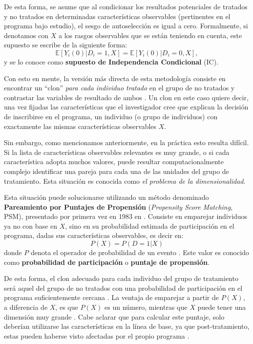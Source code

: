 \documentclass[../../main.tex]{subfiles}
\begin{document}
De esta forma, se asume que al condicionar los resultados potenciales de tratados y no
tratados en determinadas características observables (pertinentes en el programa bajo
estudio), el sesgo de autoselección es igual a cero. Formalmente, si denotamos con \(X\) a
los rasgos observables que se están teniendo en cuenta, este supuesto se escribe de la
siguiente forma:
\begin{equation}
    \mathbb{E}\left[Y_i(0)|D_i=1, X\right] = \mathbb{E}\left[Y_i(0)|D_i=0, X\right],
\end{equation}
y se lo conoce como \textbf{supuesto de Independencia Condicional} (IC).

Con esto en mente, la versión más directa de esta metodología consiste en encontrar un
``clon'' \textit{para cada individuo tratado} en el grupo de no tratados y contrastar las
variables de resultado de ambos \cite{bernal}. Un clon en este caso quiere decir, una vez
fijadas las características que el investigador cree que explican la decisión de
inscribirse en el programa, un individuo (o grupo de individuos) con exactamente las
mismas características observables \(X\).

Sin embargo, como mencionamos anteriormente, en la práctica esto resulta difícil. Si la
lista de características observables relevantes es muy grande, o si cada característica
adopta muchos valores, puede resultar computacionalmente complejo identificar una pareja
para cada una de las unidades del grupo de tratamiento. Esta situación es conocida como
\textit{el problema de la dimensionalidad}.

Esta situación puede solucionarse utilizando un método denominado \textbf{Pareamiento por
Puntajes de Propensión} (\textit{Propensity Score Matching}, PSM), presentado por primera
vez en 1983 en \cite{psm1983}. Consiste en emparejar individuos ya no con base en \(X\),
sino en su probabilidad estimada de participación en el programa, dadas sus
características observables, es decir en:
\[P(X) = P(D = 1|X)\] donde \(P\) denota el operador de probabilidad de un evento . Este
valor es conocido como \textbf{probabilidad de participación} o \textbf{puntaje de
propensión}.

De esta forma, el clon adecuado para cada individuo del grupo de tratamiento
será aquel del grupo de no tratados con una probabilidad de participación en el programa
suficientemente cercana \cite{bernal}. La ventaja de emparejar a partir de \(P(X)\), a
diferencia de \(X\), es que \(P(X)\) es un número, mientras que \(X\) puede tener una
dimensión muy grande \cite{bernal}. Cabe aclarar que para calcular este puntaje, solo
deberían utilizarse las características en la línea de base, ya que post-tratamiento,
estas pueden haberse visto afectadas por el propio programa \cite{gertler-2016}.
\end{document}
